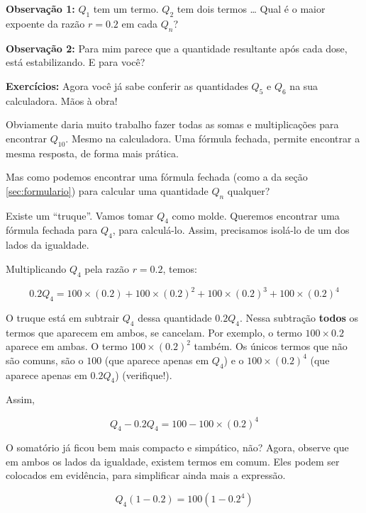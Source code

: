 \documentclass[a4paper]{article}
\begin{document}
{\bf Observação 1:} $Q_1$ tem um termo. $Q_2$ tem dois termos \ldots
Qual é o maior expoente da razão $r=0.2$ em cada $Q_n$?

{\bf Observação 2:} Para mim parece que a quantidade resultante após
cada dose, está estabilizando. E para você?

\hrulefill

{\bf Exercícios:} Agora você já sabe conferir as quantidades $Q_5$ e
$Q_6$ na sua calculadora. Mãos à obra!

\hrulefill

Obviamente daria muito trabalho fazer todas as somas e multiplicações
para encontrar $Q_{10}$. Mesmo na calculadora. Uma fórmula fechada,
permite encontrar a mesma resposta, de forma mais prática.

Mas como podemos encontrar uma fórmula fechada (como a da seção
\ref{sec:formulario}) para calcular uma quantidade $Q_n$ qualquer?

Existe um ``truque''. Vamos tomar $Q_4$ como molde. Queremos encontrar
uma fórmula fechada para $Q_4$, para calculá-lo. Assim, precisamos
isolá-lo de um dos lados da igualdade.

Multiplicando $Q_4$ pela razão $r=0.2$, temos:

\begin{displaymath}
  0.2Q_4 = 100\times (0.2)+100\times (0.2)^2+100\times (0.2)^3+100\times (0.2)^4
\end{displaymath}

O truque está em subtrair $Q_4$ dessa quantidade $0.2Q_4$. Nessa
subtração {\bf todos} os termos que aparecem em ambos, se
cancelam. Por exemplo, o termo $100\times 0.2$ aparece em ambas. O
termo $100\times (0.2)^2$ também. Os únicos termos que não são comuns,
são o $100$ (que aparece apenas em $Q_4$) e o $100\times (0.2)^4$ (que
aparece apenas em $0.2Q_4$) (verifique!).

Assim,

\begin{displaymath}
  Q_4 - 0.2Q_4 = 100 - 100\times (0.2)^4
\end{displaymath}

O somatório já ficou bem mais compacto e simpático, não? Agora,
observe que em ambos os lados da igualdade, existem termos em
comum. Eles podem ser colocados em evidência, para simplificar ainda
mais a expressão.

\begin{displaymath}
  Q_4(1-0.2) = 100(1-0.2^4)
\end{displaymath}
\end{document}
